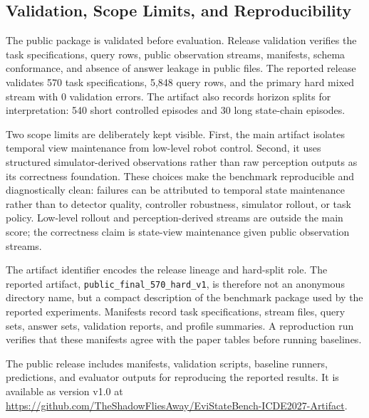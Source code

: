 \subsection{Validation, Scope Limits, and Reproducibility}

The public package is validated before evaluation. Release validation verifies the task specifications, query rows, public observation streams, manifests, schema conformance, and absence of answer leakage in public files. The reported release validates 570 task specifications, 5,848 query rows, and the primary hard mixed stream with 0 validation errors. The artifact also records horizon splits for interpretation: 540 short controlled episodes and 30 long state-chain episodes.

Two scope limits are deliberately kept visible. First, the main artifact isolates temporal view maintenance from low-level robot control. Second, it uses structured simulator-derived observations rather than raw perception outputs as its correctness foundation. These choices make the benchmark reproducible and diagnostically clean: failures can be attributed to temporal state maintenance rather than to detector quality, controller robustness, simulator rollout, or task policy. Low-level rollout and perception-derived streams are outside the main score; the correctness claim is state-view maintenance given public observation streams.

The artifact identifier encodes the release lineage and hard-split role. The reported artifact, \texttt{public\_final\_570\_hard\_v1}, is therefore not an anonymous directory name, but a compact description of the benchmark package used by the reported experiments. Manifests record task specifications, stream files, query sets, answer sets, validation reports, and profile summaries. A reproduction run verifies that these manifests agree with the paper tables before running baselines.

The public release includes manifests, validation scripts, baseline runners, predictions, and evaluator outputs for reproducing the reported results. It is available as version v1.0 at \url{https://github.com/TheShadowFliesAway/EviStateBench-ICDE2027-Artifact}.

